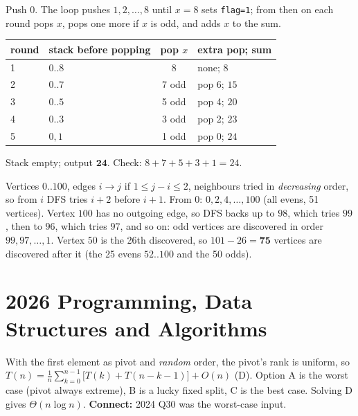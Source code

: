 \documentclass[11pt,a4paper]{article}
\newcommand{\py}[1]{\texttt{#1}}
\begin{document}
\begin{example}
Push $0$. The loop pushes $1,2,\dots,8$ until $x=8$ sets \py{flag=1}; from then on each round pops $x$, pops one more if $x$ is odd, and adds $x$ to the sum.
\begin{center}
\begin{tabular}{llcl}\toprule
round & stack before popping & pop $x$ & extra pop; sum\\\midrule
1 & $0..8$ & 8 & none; $8$\\
2 & $0..7$ & 7 odd & pop 6; $15$\\
3 & $0..5$ & 5 odd & pop 4; $20$\\
4 & $0..3$ & 3 odd & pop 2; $23$\\
5 & $0,1$ & 1 odd & pop 0; $24$\\\bottomrule
\end{tabular}
\end{center}
Stack empty; output $\mathbf{24}$. Check: $8+7+5+3+1=24$.
\end{example}

\begin{example}
Vertices $0..100$, edges $i\to j$ if $1\le j-i\le2$, neighbours tried in \emph{decreasing} order, so from $i$ DFS tries $i+2$ before $i+1$. From $0$: $0,2,4,\dots,100$ (all evens, 51 vertices). Vertex $100$ has no outgoing edge, so DFS backs up to $98$, which tries $99$, then to $96$, which tries $97$, and so on: odd vertices are discovered in order $99,97,\dots,1$. Vertex $50$ is the 26th discovered, so $101-26=\mathbf{75}$ vertices are discovered after it (the 25 evens $52..100$ and the 50 odds).
\end{example}

\section{2026 Programming, Data Structures and Algorithms}

\begin{example}
With the first element as pivot and \emph{random} order, the pivot's rank is uniform, so $T(n)=\frac1n\sum_{k=0}^{n-1}\big[T(k)+T(n-k-1)\big]+O(n)$ (D). Option A is the worst case (pivot always extreme), B is a lucky fixed split, C is the best case. Solving D gives $\Theta(n\log n)$. \textbf{Connect:} 2024 Q30 was the worst-case input.
\end{example}
\end{document}
